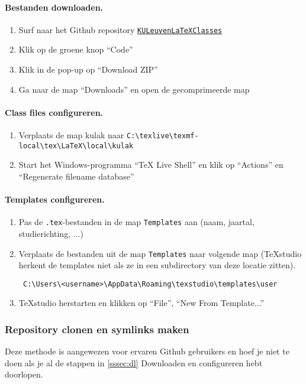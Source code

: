 \documentclass[kulak]{kulakarticle} %
\begin{document}
\paragraph{Bestanden downloaden.}
\begin{enumerate}
\item Surf naar het Github repository
\href{https://github.com/srebry/KULeuvenLaTeXClasses}{\texttt{KULeuvenLaTeXClasses}}
\item Klik op de groene knop ``Code''
\item Klik in de pop-up op ``Download ZIP''
\item Ga naar de map ``Downloads'' en open de gecomprimeerde map
\end{enumerate}
\paragraph{Class files configureren.}
\begin{enumerate}[resume]
\item Verplaats de map kulak naar \verb+C:\texlive\texmf-local\tex\LaTeX\local\kulak+
\item Start het Windows-programma ``TeX Live Shell'' en klik op ``Actions'' en ``Regenerate filename database''
\end{enumerate}
\paragraph{Templates configureren.}
\begin{enumerate}
\item Pas de \texttt{.tex}-bestanden in de map \texttt{Templates} aan (naam, jaartal, studierichting, ...)
\item Verplaats de bestanden uit de map \texttt{Templates} naar volgende map (TeXstudio herkent de templates niet als ze in een subdirectory van deze locatie zitten).
\begin{verbatim} C:\Users\<username>\AppData\Roaming\texstudio\templates\user
\end{verbatim}
\item TeXstudio herstarten en klikken op ``File'', ``New From Template...''
\end{enumerate}

\subsubsection{Repository clonen en symlinks maken}
\label{sssec:gh}
Deze methode is aangewezen voor ervaren Github gebruikers en hoef je niet te doen als je al de stappen in \ref{sssec:dl} Downloaden en configureren hebt doorlopen.
\end{document}
